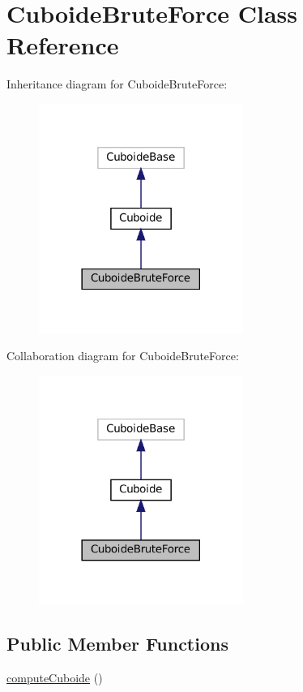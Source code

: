 \hypertarget{class_cuboide_brute_force}{}\section{Cuboide\+Brute\+Force Class Reference}
\label{class_cuboide_brute_force}


Inheritance diagram for Cuboide\+Brute\+Force\+:\nopagebreak
\begin{figure}[H]
\begin{center}
\leavevmode
\includegraphics[width=189pt]{class_cuboide_brute_force__inherit__graph}
\end{center}
\end{figure}


Collaboration diagram for Cuboide\+Brute\+Force\+:\nopagebreak
\begin{figure}[H]
\begin{center}
\leavevmode
\includegraphics[width=189pt]{class_cuboide_brute_force__coll__graph}
\end{center}
\end{figure}
\subsection*{Public Member Functions}
\begin{DoxyCompactItemize}
\item 
\hyperlink{class_cuboide_brute_force_a848838a90fadac028d553bb56fa3ee44}{compute\+Cuboide} ()
\end{DoxyCompactItemize}
